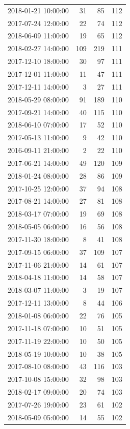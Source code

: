 \begin{tabular}{lrrr}
2018-01-21 10:00:00 & 31 & 85 & 112 \\
2017-07-24 12:00:00 & 22 & 74 & 112 \\
2018-06-09 11:00:00 & 19 & 65 & 112 \\
2018-02-27 14:00:00 & 109 & 219 & 111 \\
2017-12-10 18:00:00 & 30 & 97 & 111 \\
2017-12-01 11:00:00 & 11 & 47 & 111 \\
2017-12-11 14:00:00 & 3 & 27 & 111 \\
2018-05-29 08:00:00 & 91 & 189 & 110 \\
2017-09-21 14:00:00 & 40 & 115 & 110 \\
2018-06-10 07:00:00 & 17 & 52 & 110 \\
2017-05-13 11:00:00 & 9 & 42 & 110 \\
2016-09-11 21:00:00 & 2 & 22 & 110 \\
2017-06-21 14:00:00 & 49 & 120 & 109 \\
2018-01-24 08:00:00 & 28 & 86 & 109 \\
2017-10-25 12:00:00 & 37 & 94 & 108 \\
2017-08-21 14:00:00 & 27 & 81 & 108 \\
2018-03-17 07:00:00 & 19 & 69 & 108 \\
2018-05-05 06:00:00 & 16 & 56 & 108 \\
2017-11-30 18:00:00 & 8 & 41 & 108 \\
2017-09-15 06:00:00 & 37 & 109 & 107 \\
2017-11-06 21:00:00 & 14 & 61 & 107 \\
2018-04-18 11:00:00 & 14 & 58 & 107 \\
2018-03-07 11:00:00 & 3 & 19 & 107 \\
2017-12-11 13:00:00 & 8 & 44 & 106 \\
2018-01-08 06:00:00 & 22 & 76 & 105 \\
2017-11-18 07:00:00 & 10 & 51 & 105 \\
2017-11-19 22:00:00 & 10 & 50 & 105 \\
2018-05-19 10:00:00 & 10 & 38 & 105 \\
2017-08-10 08:00:00 & 43 & 116 & 103 \\
2017-10-08 15:00:00 & 32 & 98 & 103 \\
2018-02-17 09:00:00 & 20 & 74 & 103 \\
2017-07-26 19:00:00 & 23 & 61 & 102 \\
2018-05-09 05:00:00 & 14 & 55 & 102 \\

\end{tabular}
